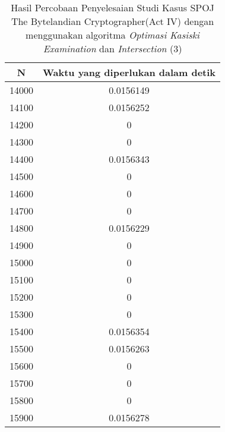 \begin{table}[H]
\centering
\begin{tabular}{|c|c|}\hline
N&Waktu yang diperlukan dalam detik\\ \hline
14000&0.0156149\\ \hline
14100&0.0156252\\ \hline
14200&0\\ \hline
14300&0\\ \hline
14400&0.0156343\\ \hline
14500&0\\ \hline
14600&0\\ \hline
14700&0\\ \hline
14800&0.0156229\\ \hline
14900&0\\ \hline
15000&0\\ \hline
15100&0\\ \hline
15200&0\\ \hline
15300&0\\ \hline
15400&0.0156354\\ \hline
15500&0.0156263\\ \hline
15600&0\\ \hline
15700&0\\ \hline
15800&0\\ \hline
15900&0.0156278\\ \hline
\end{tabular}
\caption {Hasil Percobaan Penyelesaian Studi Kasus SPOJ The Bytelandian Cryptographer(Act IV) dengan menggunakan algoritma \textit{Optimasi Kasiski Examination} dan \textit{Intersection} (3)}
\label{tab1:res6}
\end{table}
